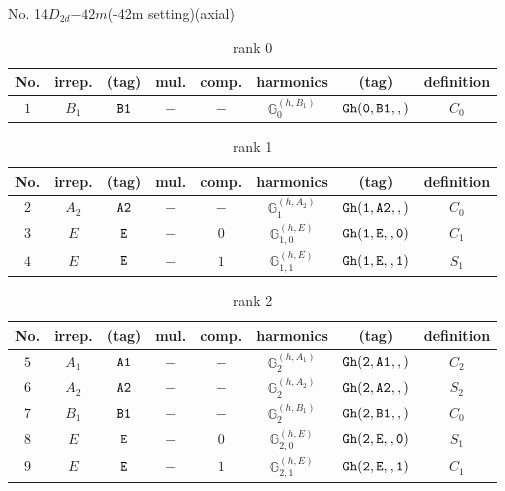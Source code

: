 \documentclass[fleqn,8pt]{jsarticle}
\begin{document}
\setcounter{MaxMatrixCols}{16}

\begin{center}
\LARGE
No. 14\quad$D_{2d}$\quad$-42m$\quad(-42m setting)\quad[ tetragonal ] (axial)
\end{center}
\begin{table}[ht!]
\begin{center}
\caption{rank 0}
\renewcommand{\arraystretch}{1.3}
\begin{tabular}{cccccccc} \hline \hline
No. & irrep. & (tag) & mul. & comp. & harmonics & (tag) & definition \\ \hline
$ 1 $ & $ B_{1} $ & $ {\tt B1} $ & $ - $ & $ - $ & $ \mathbb{G}_{0}^{(h,B_{1})} $ & $ {\tt Gh(0,B1,,)} $ & $ C_{0} $ \\
 \hline \hline
\end{tabular}
\end{center}
\end{table}
\begin{table}[ht!]
\begin{center}
\caption{rank 1}
\renewcommand{\arraystretch}{1.3}
\begin{tabular}{cccccccc} \hline \hline
No. & irrep. & (tag) & mul. & comp. & harmonics & (tag) & definition \\ \hline
$ 2 $ & $ A_{2} $ & $ {\tt A2} $ & $ - $ & $ - $ & $ \mathbb{G}_{1}^{(h,A_{2})} $ & $ {\tt Gh(1,A2,,)} $ & $ C_{0} $ \\
$ 3 $ & $ E $ & $ {\tt E} $ & $ - $ & $ 0 $ & $ \mathbb{G}_{1,0}^{(h,E)} $ & $ {\tt Gh(1,E,,0)} $ & $ C_{1} $ \\
$ 4 $ & $ E $ & $ {\tt E} $ & $ - $ & $ 1 $ & $ \mathbb{G}_{1,1}^{(h,E)} $ & $ {\tt Gh(1,E,,1)} $ & $ S_{1} $ \\
 \hline \hline
\end{tabular}
\end{center}
\end{table}
\begin{table}[ht!]
\begin{center}
\caption{rank 2}
\renewcommand{\arraystretch}{1.3}
\begin{tabular}{cccccccc} \hline \hline
No. & irrep. & (tag) & mul. & comp. & harmonics & (tag) & definition \\ \hline
$ 5 $ & $ A_{1} $ & $ {\tt A1} $ & $ - $ & $ - $ & $ \mathbb{G}_{2}^{(h,A_{1})} $ & $ {\tt Gh(2,A1,,)} $ & $ C_{2} $ \\
$ 6 $ & $ A_{2} $ & $ {\tt A2} $ & $ - $ & $ - $ & $ \mathbb{G}_{2}^{(h,A_{2})} $ & $ {\tt Gh(2,A2,,)} $ & $ S_{2} $ \\
$ 7 $ & $ B_{1} $ & $ {\tt B1} $ & $ - $ & $ - $ & $ \mathbb{G}_{2}^{(h,B_{1})} $ & $ {\tt Gh(2,B1,,)} $ & $ C_{0} $ \\
$ 8 $ & $ E $ & $ {\tt E} $ & $ - $ & $ 0 $ & $ \mathbb{G}_{2,0}^{(h,E)} $ & $ {\tt Gh(2,E,,0)} $ & $ S_{1} $ \\
$ 9 $ & $ E $ & $ {\tt E} $ & $ - $ & $ 1 $ & $ \mathbb{G}_{2,1}^{(h,E)} $ & $ {\tt Gh(2,E,,1)} $ & $ C_{1} $ \\
 \hline \hline
\end{tabular}
\end{center}
\end{table}
\end{document}
